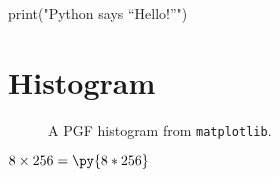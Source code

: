 \documentclass[11pt]{article}
\newcommand{\pymultiply}[2]{\py{#1*#2}}
\begin{document}
    
\begin{pycode}
print("Python says ``Hello!''")
\end{pycode}
    
\section{Histogram}

\begin{figure}
	\centering
        
    \caption{A PGF histogram from \texttt{matplotlib}.}
\end{figure}

$8 \times 256 = \pymultiply{8}{256}$
\end{document}
